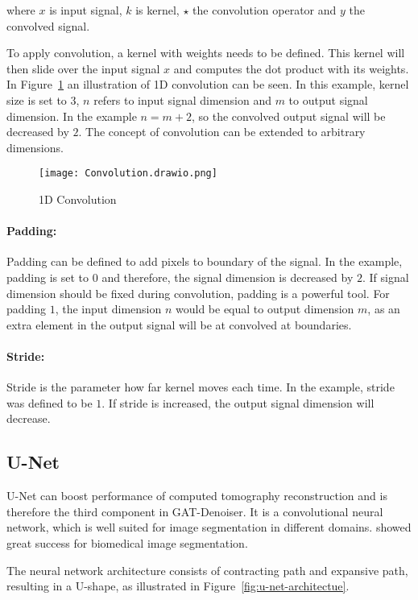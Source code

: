 where $x$ is input signal, $k$ is kernel, $\star$ the convolution operator and $y$ the convolved signal.

To apply convolution, a kernel with weights needs to be defined. 
This kernel will then slide over the input signal $x$ and computes the dot product with its weights.
In Figure~\ref{fig:1d-convolution} an illustration of 1D convolution can be seen. In this example,
kernel size is set to 3, $n$ refers to input signal dimension and $m$ to output signal dimension.
In the example  $ n = m + 2$, so the convolved output signal will be decreased by $2$.
The concept of convolution can be extended to arbitrary dimensions.

\begin{figure}[H]
  \centering
  \texttt{[image: Convolution.drawio.png]}
  \caption{1D Convolution}
  \label{fig:1d-convolution}
\end{figure}

\paragraph{Padding:} 
Padding can be defined to add pixels to boundary of the signal.
In the example, padding is set to $0$ and therefore, the signal dimension is decreased by $2$.
If signal dimension should be fixed during convolution, padding is a powerful tool. For padding $1$,
the input dimension $n$ would be equal to output dimension $m$, as an extra element in the output signal
will be at convolved at boundaries.


\paragraph{Stride:}
Stride is the parameter how far kernel moves each time. In the example, stride was defined to be $1$.
If stride is increased, the output signal dimension will decrease.


\subsection{U-Net}
\label{sec:unet}
U-Net can boost performance of computed tomography reconstruction and is therefore the third component
in GAT-Denoiser.
It is a convolutional neural network, which is well suited for image segmentation in different domains.
\cite{unet-tomography} showed great success for biomedical image segmentation.

The neural network architecture consists of contracting path and expansive path,
resulting in a U-shape, as illustrated in Figure~\ref{fig:u-net-architectue}.

